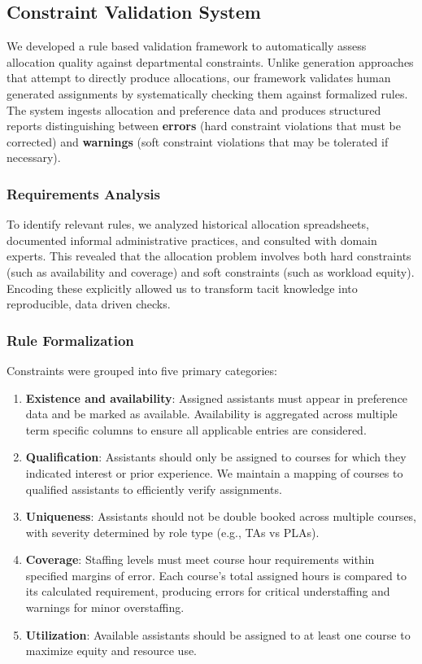 \subsection{Constraint Validation System}

We developed a rule based validation framework to automatically assess allocation quality against departmental constraints. Unlike generation approaches that attempt to directly produce allocations, our framework validates human generated assignments by systematically checking them against formalized rules. The system ingests allocation and preference data and produces structured reports distinguishing between \textbf{errors} (hard constraint violations that must be corrected) and \textbf{warnings} (soft constraint violations that may be tolerated if necessary).

\subsubsection{Requirements Analysis}

To identify relevant rules, we analyzed historical allocation spreadsheets, documented informal administrative practices, and consulted with domain experts. This revealed that the allocation problem involves both hard constraints (such as availability and coverage) and soft constraints (such as workload equity). Encoding these explicitly allowed us to transform tacit knowledge into reproducible, data driven checks.

\subsubsection{Rule Formalization}

Constraints were grouped into five primary categories:

\begin{enumerate}
    \item \textbf{Existence and availability}: Assigned assistants must appear in preference data and be marked as available. Availability is aggregated across multiple term specific columns to ensure all applicable entries are considered.
    \item \textbf{Qualification}: Assistants should only be assigned to courses for which they indicated interest or prior experience. We maintain a mapping of courses to qualified assistants to efficiently verify assignments.
    \item \textbf{Uniqueness}: Assistants should not be double booked across multiple courses, with severity determined by role type (e.g., TAs vs PLAs).
    \item \textbf{Coverage}: Staffing levels must meet course hour requirements within specified margins of error. Each course's total assigned hours is compared to its calculated requirement, producing errors for critical understaffing and warnings for minor overstaffing.
    \item \textbf{Utilization}: Available assistants should be assigned to at least one course to maximize equity and resource use.
\end{enumerate}

